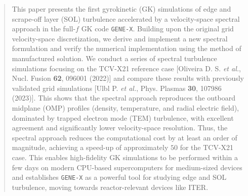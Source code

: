 \documentclass[preprint,12pt]{elsarticle}
\begin{document}
\begin{frontmatter}
\begin{abstract}
This paper presents the first gyrokinetic (GK) simulations of edge and scrape-off layer (SOL) turbulence accelerated by a velocity-space spectral approach in the full-$f$ GK code \verb|GENE-X|.
 Building upon the original grid velocity-space discretization, we derive and implement a new spectral formulation and verify the numerical implementation using the method of manufactured solution. We conduct a series of spectral turbulence simulations focusing on the TCV-X21 reference case [Oliveira D. S. \textit{et al.}, Nucl. Fusion \textbf{62}, 096001 (2022)] and compare these results with previously validated grid simulations [Ulbl P. \textit{et al.}, Phys. Plasmas \textbf{30}, 107986 (2023)]. This shows that the spectral approach reproduces the outboard midplane (OMP) profiles (density, temperature, and radial electric field), dominated by trapped electron mode (TEM) turbulence, with excellent agreement and significantly lower velocity-space resolution. Thus, the spectral approach reduces the computational cost by at least an order of magnitude, achieving a speed-up of approximately $50$ for the TCV-X21 case. This enables high-fidelity GK simulations to be performed within a few days on modern CPU-based supercomputers for medium-sized devices and establishes \verb|GENE-X| as a powerful tool for studying edge and SOL turbulence, moving towards reactor-relevant devices like ITER.
\end{abstract}







\end{frontmatter}
\end{document}
